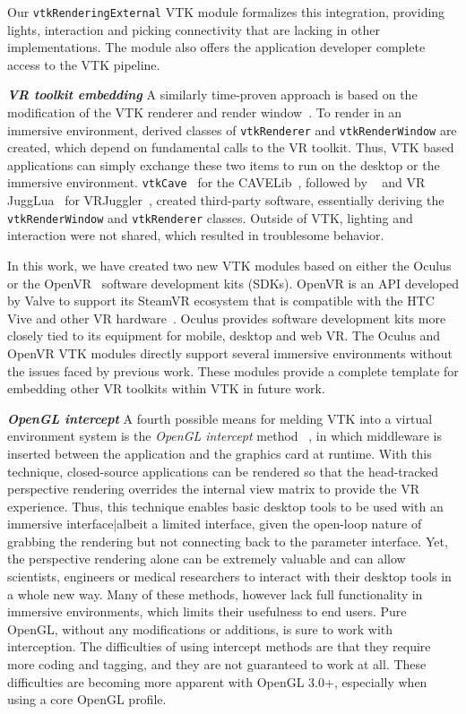Our \texttt{vtkRenderingExternal} VTK module formalizes this integration, providing lights, interaction and picking connectivity that are lacking in other implementations. The module also offers the application developer complete access to the VTK pipeline.

\textbf{\textit{VR toolkit embedding}} A similarly time-proven approach is based on the modification of the VTK renderer and render window~\cite{van2000vista, Hannema:2001, Shamonin02vtkcave, Belleman:2003}. 
To render in an immersive environment, derived classes of
\texttt{vtkRenderer} and \texttt{vtkRenderWindow} are created, which depend on fundamental calls to the VR toolkit.
Thus, VTK based applications can simply exchange these two items to run on the desktop or the immersive environment.
\texttt{vtkCave}~\cite{Tufo:1999} for the CAVELib~\cite{CAVELib:2016}, followed by
~\cite{Blom:2006} and VR JuggLua~\cite{Pavlik:2012} for
VRJuggler~\cite{Bierbaum:2001}, created third-party software, essentially
deriving the \texttt{vtkRenderWindow} and \texttt{vtkRenderer} classes. Outside of VTK, lighting and interaction were not shared, which resulted in troublesome behavior.

In this work, we have created two new VTK modules based on either the Oculus~\cite{Oculus:2016} or the OpenVR~\cite{OpenVR:2016} software development kits (SDKs).
OpenVR is an API developed by Valve to support its SteamVR ecosystem that is compatible with the HTC Vive and other VR hardware~\cite{Road2VR:2015}. Oculus provides software development kits more closely tied to its equipment for mobile, desktop and web VR. The Oculus and OpenVR VTK modules directly support several immersive environments
without the issues faced by previous work. These modules provide a complete template
for embedding other VR toolkits within VTK in future work.

\textit{\textbf{OpenGL intercept}}
A fourth possible means for melding VTK into a virtual environment system
is the \textit{OpenGL intercept} method
~\cite{Humphreys:2001,Humphreys:2002,Zielinski:2014,TechViz:2016,Conduit:2016}, in which middleware is inserted between the application and the graphics card at runtime.
With this technique, closed-source applications can be rendered so that
the head-tracked perspective rendering overrides the internal view matrix
to provide the VR experience.
Thus, this technique enables basic desktop tools to be used with an
immersive interface|albeit a limited interface, given the open-loop nature of
grabbing the rendering but not connecting back to the parameter interface.
Yet, the perspective rendering alone can be extremely valuable and can allow
scientists, engineers or medical researchers to interact with their desktop
tools in a whole new way. Many of these methods, however lack full functionality in immersive environments, which limits their usefulness to end users.
Pure OpenGL, without any modifications or additions, is sure to work with interception.
The difficulties of using intercept methods are that they require more coding
and tagging, and they are not guaranteed to work at all. These difficulties are becoming
more apparent with OpenGL 3.0+, especially when using a core OpenGL profile.

